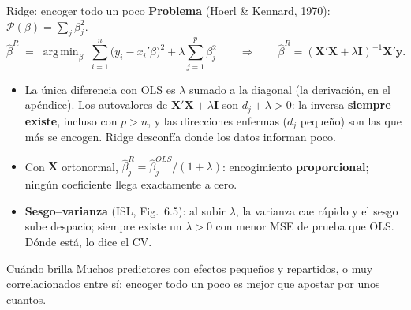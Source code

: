 \documentclass{beamer}
\newcommand{\1}{\mathbb{I}}
\DeclareMathOperator*{\argmin}{arg\,min}
\begin{document}
\begin{frame}{Ridge: encoger todo un poco}
\small
\textbf{Problema} (Hoerl \& Kennard, 1970): $\mathcal{P}(\beta) = \sum_j \beta_j^2$.
\[ \hat{\beta}^{R} \;=\; \argmin_{\beta} \; \sum_{i=1}^n \big(y_i - x_i'\beta\big)^2 + \lambda \sum_{j=1}^p \beta_j^2 \qquad \Longrightarrow \qquad \hat{\beta}^{R} = (\mathbf{X}'\mathbf{X} + \lambda \mathbf{I})^{-1}\mathbf{X}'\mathbf{y}. \]
\pause
\begin{itemize}\itemsep3pt
  \item La única diferencia con OLS es $\lambda$ sumado a la diagonal (la derivación, en el apéndice). Los autovalores de $\mathbf{X}'\mathbf{X} + \lambda\mathbf{I}$ son $d_j + \lambda > 0$: la inversa \textbf{siempre existe}, incluso con $p > n$, y las direcciones enfermas ($d_j$ pequeño) son las que más se encogen. Ridge desconfía donde los datos informan poco. \pause
  \item Con $\mathbf{X}$ ortonormal, $\hat{\beta}^R_j = \hat{\beta}^{OLS}_j / (1 + \lambda)$: encogimiento \textbf{proporcional}; ningún coeficiente llega exactamente a cero. \pause
  \item \textbf{Sesgo--varianza} (ISL, Fig.~6.5): al subir $\lambda$, la varianza cae rápido y el sesgo sube despacio; siempre existe un $\lambda > 0$ con menor MSE de prueba que OLS. Dónde está, lo dice el CV.
\end{itemize}
\pause
\begin{block}{Cuándo brilla}
Muchos predictores con efectos pequeños y repartidos, o muy correlacionados entre sí: encoger todo un poco es mejor que apostar por unos cuantos.
\end{block}
\end{frame}
\end{document}
